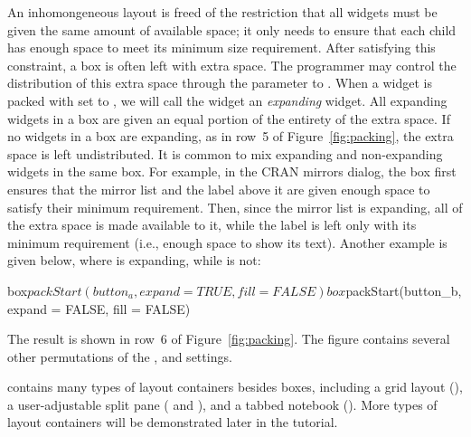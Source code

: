 \documentclass[article,shortnames]{jss}
\begin{document}
An inhomongeneous layout is freed of the restriction that all widgets
must be given the same amount of available space; it only needs to
ensure that each child has enough space to meet its minimum size
requirement. After satisfying this constraint, a box is often left
with extra space. The programmer may control the distribution of this
extra space through the  parameter to
.  When a widget is packed with 
set to , we will call the widget an \emph{expanding}
widget. All expanding widgets in a box are given an equal portion of
the entirety of the extra space. If no widgets in a box are expanding,
as in row~5 of Figure~\ref{fig:packing}, the extra space is left
undistributed. It is common to mix expanding and non-expanding widgets
in the same box. For example, in the CRAN mirrors dialog, the box
first ensures that the mirror list and the label above it are given
enough space to satisfy their minimum requirement. Then, since the
mirror list is expanding, all of the extra space is made available to
it, while the label is left only with its minimum requirement (i.e.,
enough space to show its text).
Another example is given below, where  is expanding,
while  is not:
\begin{Code}
box$packStart(button_a, expand = TRUE, fill = FALSE)
box$packStart(button_b, expand = FALSE, fill = FALSE)
\end{Code}
The result is shown in row~6 of Figure~\ref{fig:packing}. 
The figure contains several other permutations of the
,  and  settings.

 contains many types of layout containers besides boxes,
including 
a grid layout (), a user-adjustable split pane
(
and ), and a tabbed notebook ().
More types of
layout containers will be demonstrated later in the tutorial.


\end{document}
